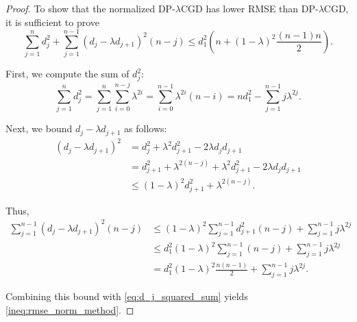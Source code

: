 \documentclass{article}
\theoremstyle{plain}
\theoremstyle{definition}
\theoremstyle{remark}
\newcommand{\method}{DP-$\lambda$CGD\xspace}
\begin{document}
\begin{proof}
To show that the normalized \method has lower RMSE than \method, it is sufficient to prove
\begin{equation}
\label{ineq:rmse_norm_method}
    \sum\limits_{j = 1}^{n} d_j^2
    + \sum\limits_{j = 1}^{n - 1} (d_j - \lambda d_{j + 1})^2 (n - j)
    \le d_1^2 \left(n + (1 - \lambda)^2 \frac{(n - 1)n}{2}\right).
\end{equation}

First, we compute the sum of $d_j^2$:
\begin{equation}
\label{eq:d_j_squared_sum}
    \sum\limits_{j = 1}^{n} d_j^2
    = \sum\limits_{j = 1}^{n}\sum\limits_{i = 0}^{n - j }\lambda^{2i}
    = \sum\limits_{i = 0}^{n - 1}\lambda^{2i} (n - i)
    = n d_1^2 - \sum\limits_{j = 1}^{n - 1} j\lambda^{2j}.
\end{equation}

Next, we bound $d_j - \lambda d_{j + 1}$ as follows:
\begin{equation}
\begin{aligned}
    (d_j - \lambda d_{j + 1})^2
    &= d_j^2 +\lambda^2 d_{j + 1}^2 - 2\lambda d_j d_{j + 1}\\
    &= d_{j + 1}^2 + \lambda^{2(n - j)} +\lambda^2 d_{j + 1}^2 -2\lambda d_j d_{j + 1}\\
    &\le (1 -\lambda)^2 d_{j + 1}^2 + \lambda^{2(n - j)}.
\end{aligned}
\end{equation}

Thus,
\begin{align}
    \sum\limits_{j = 1}^{n - 1}(d_j - \lambda d_{j + 1})^2 (n - j)
    &\le (1-\lambda)^2 \sum\limits_{j = 1}^{n -1} d_{j + 1}^2 (n -j)
      + \sum\limits_{j = 1}^{n - 1} j \lambda^{2j} \\
    &\le d_1^2 (1 - \lambda)^2 \sum\limits_{j = 1}^{n - 1} (n- j)
      + \sum\limits_{j = 1}^{n - 1} j \lambda^{2j}\\
    &= d_1^2 (1 - \lambda)^2 \frac{n ( n - 1)}{2 }
      + \sum\limits_{j = 1}^{n - 1} j \lambda^{2j}.
\end{align}

Combining this bound with \eqref{eq:d_j_squared_sum} yields \eqref{ineq:rmse_norm_method}.
\end{proof}
\end{document}
